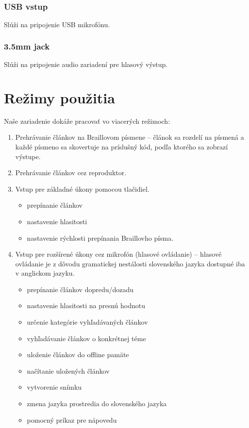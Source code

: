 \documentclass{template/socthesis}
\begin{document}
\subsubsection{USB vstup}
Slúži na pripojenie USB mikrofónu.

\subsubsection{3.5mm jack}
Slúži na pripojenie audio zariadení pre hlasový výstup.

\section{Režimy použitia}
Naše zariadenie dokáže pracovať	 vo viacerých režimoch:
\begin{enumerate}
\item Prehrávanie článkov na Braillovom písmene -- článok sa rozdelí na písmená a každé písmeno sa skovertuje na príslušný kód, podľa ktorého sa zobrazí výstupe.
\item Prehrávanie článkov cez reproduktor.
\item Vstup pre základné úkony pomocou tlačidiel. 
\begin{itemize}
\item prepínanie článkov
\item nastavenie hlasitosti
\item nastavenie rýchlosti prepínania Braillovho písma.
\end{itemize}
\item Vstup pre rozšírené úkony cez mikrofón (hlasové ovládanie) -- hlasové ovládanie je z dôvodu gramatickej nestálosti slovenského jazyka dostupné iba v anglickom jazyku.
\begin{itemize}
\item prepínanie článkov dopredu/dozadu
\item nastavenie hlasitosti na presnú hodnotu
\item určenie kategórie vyhľadávaných článkov 
\item vyhľadávanie článkov o konkrétnej téme
\item uloženie článkov do offline pamäte
\item načítanie uložených článkov
\item vytvorenie snímku
\item zmena jazyka prostredia do slovenského jazyka
\item pomocný príkaz pre nápovedu
\end{itemize}
\end{enumerate}
\end{document}
